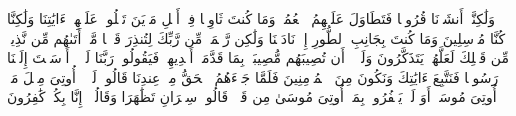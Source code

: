 \stopbuffer
\startbuffer[\q:28:45]
وَلَٰكِنَّاۤ أَنشَأۡنَا قُرُونࣰا فَتَطَاوَلَ عَلَیۡهِمُ ٱلۡعُمُرُۚ وَمَا كُنتَ ثَاوِیࣰا فِیۤ أَهۡلِ مَدۡیَنَ تَتۡلُوا۟ عَلَیۡهِمۡ ءَایَٰتِنَا وَلَٰكِنَّا كُنَّا مُرۡسِلِینَ%
\stopbuffer
\startbuffer[\q:28:46]
وَمَا كُنتَ بِجَانِبِ ٱلطُّورِ إِذۡ نَادَیۡنَا وَلَٰكِن رَّحۡمَةࣰ مِّن رَّبِّكَ لِتُنذِرَ قَوۡمࣰا مَّاۤ أَتَىٰهُم مِّن نَّذِیرࣲ مِّن قَبۡلِكَ لَعَلَّهُمۡ یَتَذَكَّرُونَ%
\stopbuffer
\startbuffer[\q:28:47]
وَلَوۡلَاۤ أَن تُصِیبَهُم مُّصِیبَةُۢ بِمَا قَدَّمَتۡ أَیۡدِیهِمۡ فَیَقُولُوا۟ رَبَّنَا لَوۡلَاۤ أَرۡسَلۡتَ إِلَیۡنَا رَسُولࣰا فَنَتَّبِعَ ءَایَٰتِكَ وَنَكُونَ مِنَ ٱلۡمُؤۡمِنِینَ%
\stopbuffer
\startbuffer[\q:28:48]
فَلَمَّا جَاۤءَهُمُ ٱلۡحَقُّ مِنۡ عِندِنَا قَالُوا۟ لَوۡلَاۤ أُوتِیَ مِثۡلَ مَاۤ أُوتِیَ مُوسَىٰۤۚ أَوَ لَمۡ یَكۡفُرُوا۟ بِمَاۤ أُوتِیَ مُوسَىٰ مِن قَبۡلُۖ قَالُوا۟ سِحۡرَانِ تَظَٰهَرَا وَقَالُوۤا۟ إِنَّا بِكُلࣲّ كَٰفِرُونَ%
\stopbuffer
